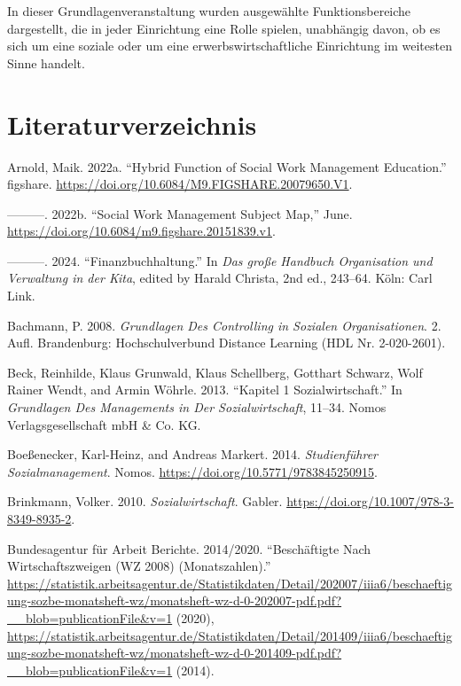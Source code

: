 \documentclass[
  letterpaper,
]{book}
\newlength{\cslhangindent}
\newenvironment{CSLReferences}[2] %
 {\begin{list}{}{%
  \setlength{\itemindent}{0pt}
  \setlength{\leftmargin}{0pt}
  \setlength{\parsep}{0pt}
  \ifodd #1
   \setlength{\leftmargin}{\cslhangindent}
   \setlength{\itemindent}{-1\cslhangindent}
  \fi
  \setlength{\itemsep}{#2\baselineskip}}}
 {\end{list}}
\begin{document}
In dieser Grundlagenveranstaltung wurden ausgewählte Funktionsbereiche
dargestellt, die in jeder Einrichtung eine Rolle spielen, unabhängig
davon, ob es sich um eine soziale oder um eine erwerbswirtschaftliche
Einrichtung im weitesten Sinne handelt.

\cleardoublepage
{}
{}
\appendix

\chapter{Literaturverzeichnis}\label{literaturverzeichnis}

\label{refs}
\begin{CSLReferences}{1}{0}
Arnold, Maik. 2022a. {``Hybrid Function of Social Work Management
Education.''} figshare.
\url{https://doi.org/10.6084/M9.FIGSHARE.20079650.V1}.

---------. 2022b. {``{Social Work Management Subject Map},''} June.
\url{https://doi.org/10.6084/m9.figshare.20151839.v1}.

---------. 2024. {``Finanzbuchhaltung.''} In \emph{Das große Handbuch
Organisation und Verwaltung in der Kita}, edited by Harald Christa, 2nd
ed., 243--64. Köln: Carl Link.

Bachmann, P. 2008. \emph{Grundlagen Des Controlling in Sozialen
Organisationen}. 2. Aufl. Brandenburg: Hochschulverbund Distance
Learning (HDL Nr. 2-020-2601).

Beck, Reinhilde, Klaus Grunwald, Klaus Schellberg, Gotthart Schwarz,
Wolf Rainer Wendt, and Armin Wöhrle. 2013. {``Kapitel 1
Sozialwirtschaft.''} In \emph{Grundlagen Des Managements in Der
Sozialwirtschaft}, 11--34. Nomos Verlagsgesellschaft mbH \& Co. KG.

Boeßenecker, Karl-Heinz, and Andreas Markert. 2014. \emph{Studienführer
Sozialmanagement}. Nomos. \url{https://doi.org/10.5771/9783845250915}.

Brinkmann, Volker. 2010. \emph{Sozialwirtschaft}. Gabler.
\url{https://doi.org/10.1007/978-3-8349-8935-2}.

Bundesagentur für Arbeit Berichte. 2014/2020. {``Beschäftigte Nach
Wirtschaftszweigen (WZ 2008) (Monatszahlen).''}
\url{https://statistik.arbeitsagentur.de/Statistikdaten/Detail/202007/iiia6/beschaeftigung-sozbe-monatsheft-wz/monatsheft-wz-d-0-202007-pdf.pdf?__blob=publicationFile&v=1}
(2020),
\url{https://statistik.arbeitsagentur.de/Statistikdaten/Detail/201409/iiia6/beschaeftigung-sozbe-monatsheft-wz/monatsheft-wz-d-0-201409-pdf.pdf?__blob=publicationFile&v=1}
(2014).


\end{CSLReferences}
\end{document}
